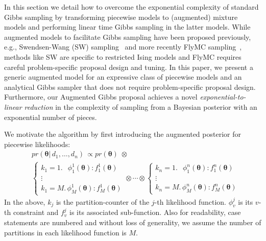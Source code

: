 \documentclass[letterpaper]{article}
\begin{document}
In this section we detail how to overcome the exponential complexity of standard Gibbs
sampling by transforming piecewise models to (augmented) mixture models and performing
linear time Gibbs sampling in the latter models. 
While augmented models to facilitate
Gibbs sampling have been proposed previously, e.g., Swendsen-Wang (SW) sampling~\cite{sw_mc} 
and more recently FlyMC sampling~\cite{fly_mc}, methods like SW are specific to restricted
Ising models and FlyMC requires careful problem-specific proposal design and tuning.  In this paper,
we present a generic augmented model for an expressive class of piecewise models and
an analytical Gibbs sampler that does not require problem-specific proposal design.  
Furthermore, our Augmented Gibbs proposal achieves a novel \emph{exponential-to-linear reduction} in the complexity
of sampling from a Bayesian posterior with an exponential number of pieces.

We motivate the algorithm by first introducing the augmented posterior for piecewise likelihoods:
{\small
\begin{align*}
&pr(\boldsymbol\theta | \, d_1, \ldots, d_n) \, 
\propto 
pr(\boldsymbol\theta) \; \otimes
\\
&%
\begin{cases}
\boxed{k_1 = 1.} \;\;\, {\phi^{1}_{1}(\boldsymbol\theta)  : f^{1}_{1}(\boldsymbol\theta)}\\
\vdots
\\
\boxed{k_1 = M.} \, \phi^{1}_{M}(\boldsymbol\theta)  \!:\! f^{1}_{M}(\boldsymbol\theta)
\end{cases}
\!\!\!\!\!\!\!\!\!\!\!\!\!
\otimes
\cdots
\otimes
\begin{cases}
\boxed{k_n = 1.} \;\;\, \phi^{n}_{1}(\boldsymbol\theta)  : f^{n}_{1}(\boldsymbol\theta)\\
\vdots
\\
\boxed{k_n = M.} \, \phi^{n}_{M}(\boldsymbol\theta)  \!:\! f^{n}_{M}(\boldsymbol\theta)
\end{cases}
\end{align*} 
}%
In the above, $k_j$ is the partition-counter of the $j$-th likelihood function. 
$\phi^j_{v}$ is its $v$-th constraint and
 $f^j_{v}$ is its associated sub-function. 
 Also for readability, case statements are numbered and without loss of
generality, we assume the number of partitions in each
likelihood function is $M$.
\end{document}
